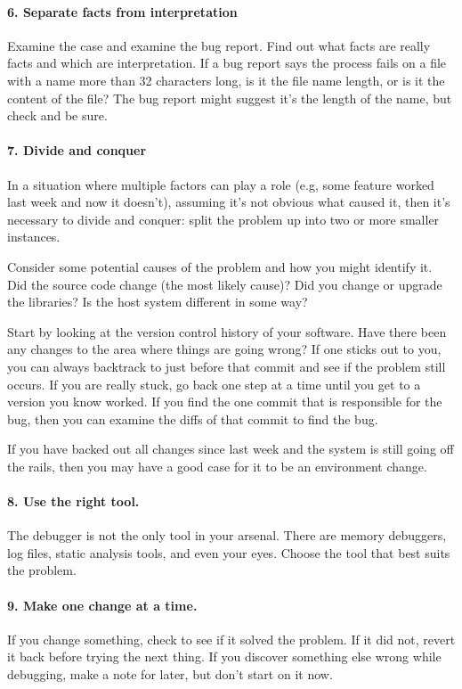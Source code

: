 \paragraph{6. Separate facts from interpretation}
Examine the case and examine the bug report. Find out what facts are really facts and which are interpretation. If a bug report says the process fails on a file with a name more than 32 characters long, is it the file name length, or is it the content of the file? The bug report might suggest it's the length of the name, but check and be sure.

\paragraph{7. Divide and conquer}
In a situation where multiple factors can play a role (e.g, some feature worked last week and now it doesn't), assuming it's not obvious what caused it, then it's necessary to divide and conquer: split the problem up into two or more smaller instances.

Consider some potential causes of the problem and how you might identify it. Did the source code change (the most likely cause)? Did you change or upgrade the libraries? Is the host system different in some way? 

Start by looking at the version control history of your software. Have there been any changes to the area where things are going wrong? If one sticks out to you, you can always backtrack to just before that commit and see if the problem still occurs. If you are really stuck, go back one step at a time until you get to a version you know worked. If you find the one commit that is responsible for the bug, then you can examine the diffs of that commit to find the bug.

If you have backed out all changes since last week and the system is still going off the rails, then you may have a good case for it to be an environment change. 

\paragraph{8. Use the right tool.}
The debugger is not the only tool in your arsenal. There are memory debuggers, log files, static analysis tools, and even your eyes. Choose the tool that best suits the problem.

\paragraph{9. Make one change at a time.}
If you change something, check to see if it solved the problem. If it did not, revert it back before trying the next thing. If you discover something else wrong while debugging, make a note for later, but don't start on it now. 

